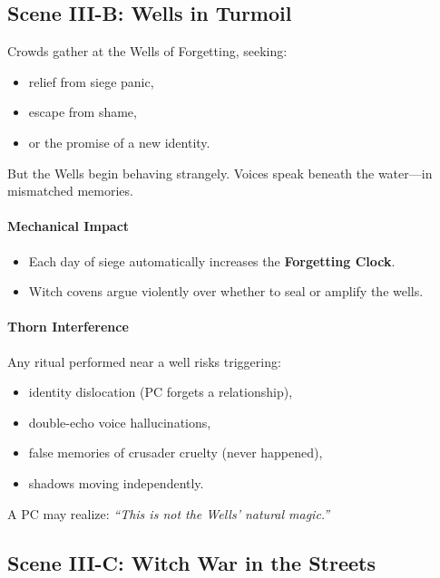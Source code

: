 \documentclass[11pt]{book}
\begin{document}
\subsection*{Scene III-B: Wells in Turmoil}

Crowds gather at the Wells of Forgetting, seeking:
\begin{itemize}[leftmargin=*]
    \item relief from siege panic,
    \item escape from shame,
    \item or the promise of a new identity.
\end{itemize}

But the Wells begin behaving strangely.  
Voices speak beneath the water---in mismatched memories.

\paragraph{Mechanical Impact}
\begin{itemize}
    \item Each day of siege automatically increases the \textbf{Forgetting Clock}.
    \item Witch covens argue violently over whether to seal or amplify the wells.
\end{itemize}

\paragraph{Thorn Interference}
Any ritual performed near a well risks triggering:
\begin{itemize}
    \item identity dislocation (PC forgets a relationship),
    \item double-echo voice hallucinations,
    \item false memories of crusader cruelty (never happened),
    \item shadows moving independently.
\end{itemize}

A PC may realize:  
\emph{``This is not the Wells' natural magic.''}

\subsection*{Scene III-C: Witch War in the Streets}
\end{document}

